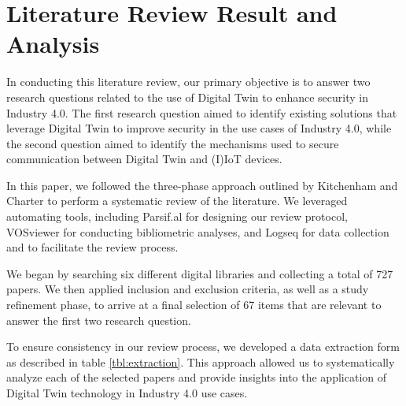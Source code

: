 \section{Literature Review Result and Analysis}
In conducting this literature review, our primary objective is to answer two research questions related to the use of Digital Twin to enhance security in Industry 4.0. The first research question aimed to identify existing solutions that leverage Digital Twin to improve security in the use cases of Industry 4.0, while the second question aimed to identify the mechanisms used to secure communication between Digital Twin and (I)IoT devices.

In this paper, we followed the three-phase approach outlined by Kitchenham and Charter \cite{kitchenham_guidelines_2007} to perform a systematic review of the literature. We leveraged automating tools, including Parsif.al for designing our review protocol, VOSviewer for conducting bibliometric analyses, and Logseq for data collection and to facilitate the review process.

We began by searching six different digital libraries and collecting a total of 727 papers. We then applied inclusion and exclusion criteria, as well as a study refinement phase, to arrive at a final selection of 67 items that are relevant to answer the first two research question.

To ensure consistency in our review process, we developed a data extraction form as described in table \ref{tbl:extraction}. This approach allowed us to systematically analyze each of the selected papers and provide insights into the application of Digital Twin technology in Industry 4.0 use cases.





